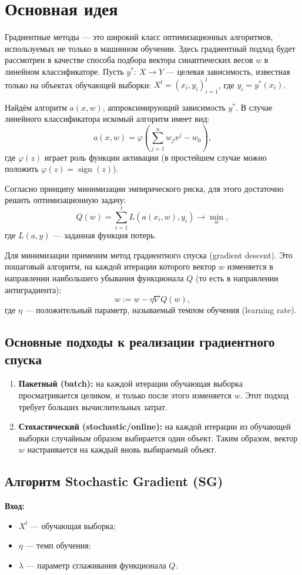 \section*{Основная идея}

Градиентные методы --- это широкий класс оптимизационных алгоритмов, используемых не только в машинном обучении. Здесь градиентный подход будет рассмотрен в качестве способа подбора вектора синаптических весов \( w \) в линейном классификаторе. Пусть \( y^*: \, X \to Y \) — целевая зависимость, известная только на объектах обучающей выборки: \( X^l = (x_i, y_i)_{i=1}^l \), где \( y_i = y^*(x_i) \).

Найдём алгоритм \( a(x, w) \), аппроксимирующий зависимость \( y^* \). В случае линейного классификатора искомый алгоритм имеет вид:
$$ a(x, w) = \varphi\left(\sum_{j=1}^n w_j x^j - w_0\right), $$
где \( \varphi(z) \) играет роль функции активации (в простейшем случае можно положить \( \varphi(z) = \operatorname{sign}(z) \)).

Согласно принципу минимизации эмпирического риска, для этого достаточно решить оптимизационную задачу:
$$ Q(w) = \sum_{i=1}^l L(a(x_i, w), y_i) \to \min_w, $$
где \( L(a, y) \) — заданная функция потерь.

Для минимизации применим метод градиентного спуска (gradient descent). Это пошаговый алгоритм, на каждой итерации которого вектор \( w \) изменяется в направлении наибольшего убывания функционала \( Q \) (то есть в направлении антиградиента):
$$ w := w - \eta \nabla Q(w), $$
где \( \eta \) — положительный параметр, называемый темпом обучения (learning rate).

\subsection*{Основные подходы к реализации градиентного спуска}
\begin{enumerate}
    \item \textbf{Пакетный (batch):} на каждой итерации обучающая выборка просматривается целиком, и только после этого изменяется \( w \). Этот подход требует больших вычислительных затрат.
    \item \textbf{Стохастический (stochastic/online):} на каждой итерации из обучающей выборки случайным образом выбирается один объект. Таким образом, вектор \( w \) настраивается на каждый вновь выбираемый объект.
\end{enumerate}

\subsection*{Алгоритм Stochastic Gradient (SG)}
\textbf{Вход:}
\begin{itemize}
    \item \( X^l \) --- обучающая выборка;
    \item \( \eta \) --- темп обучения;
    \item \( \lambda \) --- параметр сглаживания функционала \( Q \).
\end{itemize}


